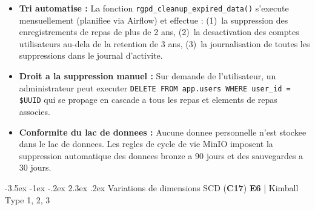 \documentclass[a4paper,11pt,oneside,openany]{report}
\makeatletter
\renewcommand\section{\@startsection{section}{1}{\z@}%
  {-3.5ex \@plus -1ex \@minus -.2ex}%
  {2.3ex \@plus.2ex}%
  {\normalfont\Large\bfseries\color{ntgreen}}}
\newcommand{\competence}[1]{\textbf{\textcolor{ntgreen}{#1}}}
\newcommand{\evaluation}[1]{\textbf{\textcolor{ntblue}{#1}}}
\makeatother
\begin{document}
\begin{itemize}[nosep]
  \item \textbf{Tri automatise :} La fonction \texttt{rgpd\_cleanup\_expired\_data()}
        s'execute mensuellement (planifiee via Airflow) et effectue :
        (1)~la suppression des enregistrements de repas de plus de 2 ans,
        (2)~la desactivation des comptes utilisateurs au-dela de la retention
        de 3 ans, (3)~la journalisation de toutes les suppressions dans le
        journal d'activite.
  \item \textbf{Droit a la suppression manuel :} Sur demande de l'utilisateur,
        un administrateur peut executer
        \texttt{DELETE FROM app.users WHERE user\_id = \$UUID} qui se propage
        en cascade a tous les repas et elements de repas associes.
  \item \textbf{Conformite du lac de donnees :} Aucune donnee personnelle n'est
        stockee dans le lac de donnees. Les regles de cycle de vie MinIO
        imposent la suppression automatique des donnees bronze a 90 jours et
        des sauvegardes a 30 jours.
\end{itemize}


\section{Variations de dimensions SCD (\competence{C17})}
\label{sec:c17}
{\small\evaluation{E6} | Kimball Type 1, 2, 3}
\end{document}
